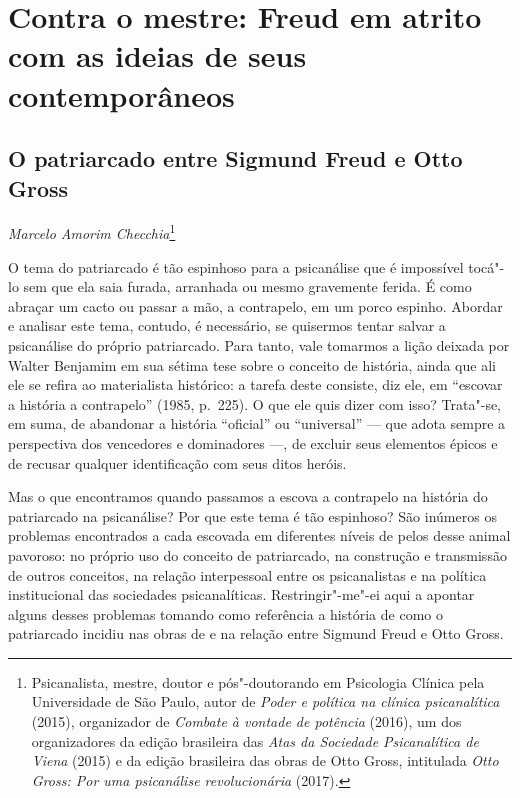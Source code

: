 \part{Contra o mestre: Freud em atrito com as ideias de seus contemporâneos}


\chapter*{O patriarcado entre Sigmund Freud e Otto Gross}


\begin{flushright}
\emph{Marcelo Amorim Checchia}\footnote{Psicanalista, mestre, doutor e
  pós"-doutorando em Psicologia Clínica pela Universidade de São Paulo,
  autor de \emph{Poder e política na clínica psicanalítica} (2015),
  organizador de \emph{Combate à vontade de potência} (2016), um dos
  organizadores da edição brasileira das \emph{Atas da Sociedade
  Psicanalítica de Viena} (2015) e da edição brasileira das obras de
  Otto Gross, intitulada \emph{Otto Gross: Por uma psicanálise
  revolucionária} (2017).}
\end{flushright}

O tema do patriarcado é tão espinhoso para a psicanálise que é
impossível tocá"-lo sem que ela saia furada, arranhada ou mesmo
gravemente ferida. É como abraçar um cacto ou passar a mão, a
contrapelo, em um porco espinho. Abordar e analisar este tema, contudo,
é necessário, se quisermos tentar salvar a psicanálise do próprio
patriarcado. Para tanto, vale tomarmos a lição deixada por Walter
Benjamim em sua sétima tese sobre o conceito de história, ainda que ali
ele se refira ao materialista histórico: a tarefa deste consiste, diz
ele, em ``escovar a história a contrapelo'' (1985, p.~225). O que ele quis dizer com
isso? Trata"-se, em suma, de abandonar a história ``oficial'' ou
``universal'' --- que adota sempre a perspectiva dos vencedores e
dominadores ---, de excluir seus elementos épicos e de recusar qualquer
identificação com seus ditos heróis.

Mas o que encontramos quando passamos a escova a contrapelo na história
do patriarcado na psicanálise? Por que este tema é tão espinhoso? São
inúmeros os problemas encontrados a cada escovada em diferentes níveis
de pelos desse animal pavoroso: no próprio uso do conceito de
patriarcado, na construção e transmissão de outros conceitos, na relação
interpessoal entre os psicanalistas e na política institucional das
sociedades psicanalíticas. Restringir"-me"-ei aqui a apontar alguns desses
problemas tomando como referência a história de como o patriarcado
incidiu nas obras de e na relação entre Sigmund Freud e Otto Gross.

